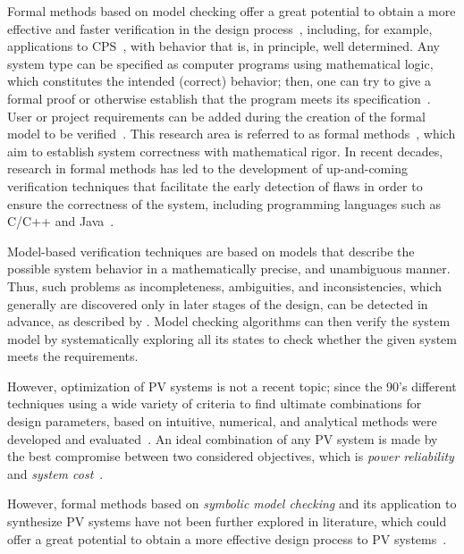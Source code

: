 Formal methods based on model checking offer a great potential to obtain a more effective and faster verification in the design process~\cite{ClarkeHV18}, including, for example, applications to CPS~\cite{Abateetal2017,AbateBCCDKK17,Bessa,ChavesBCKF17}, with behavior that is, in principle, well determined. 
Any system type can be specified as computer programs using mathematical logic, which constitutes the intended (correct) behavior; then, one can try to give a formal proof or otherwise establish that the program meets its specification~\cite{DBLP:journals/sttt/GadelhaIC17}. User or project requirements can be added during the creation of the formal model to be verified~\cite{Trindade,TrindadeDJISC17}. 
%
This research area is referred to as formal methods~\cite{Clarkeetal}, which aim to establish system correctness with mathematical rigor. 
In recent decades, research in formal methods has led to the development of up-and-coming verification techniques that facilitate the early detection of flaws in order to ensure the correctness of the system, including programming languages such as C/C++ and Java~\cite{esbmc2018,RamalhoFSMC013,CordeiroKKST18}. 

Model-based verification techniques are based on models that describe the possible system behavior in a mathematically precise, and unambiguous manner. Thus, such problems as incompleteness, ambiguities, and inconsistencies, which generally are discovered only in later stages of the design, can be detected in advance, as described by \cite{Trindade,TrindadeDJISC17}. 
Model checking algorithms can then verify the system model by systematically exploring all its states to check whether the given system meets the requirements.
%
%

However, optimization of PV systems is not a recent topic; since the $90$'s different techniques using a wide variety of criteria to find ultimate combinations for design parameters, based on intuitive, numerical, and analytical methods were developed and evaluated~\cite{Applasamy2011}. An ideal combination of any PV system is made by the best compromise between two considered objectives, which is \textit{power reliability} and \textit{system cost}~\cite{Alsadi2018}.
 
However, formal methods based on \textit{symbolic model checking} and its application to synthesize PV systems have not been further explored in literature, which could offer a great potential to obtain a more effective design process to PV systems~\cite{ClarkeHV18}.

